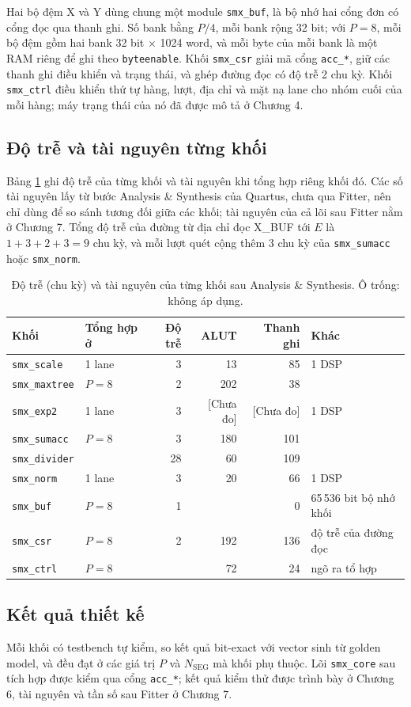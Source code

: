 Hai bộ đệm X và Y dùng chung một module \texttt{smx\_buf}, là bộ nhớ hai cổng đơn có cổng đọc qua thanh ghi. Số bank bằng $P/4$, mỗi bank rộng 32 bit; với $P = 8$, mỗi bộ đệm gồm hai bank 32 bit $\times$ 1024 word, và mỗi byte của mỗi bank là một RAM riêng để ghi theo \texttt{byteenable}. Khối \texttt{smx\_csr} giải mã cổng \texttt{acc\_*}, giữ các thanh ghi điều khiển và trạng thái, và ghép đường đọc có độ trễ 2 chu kỳ. Khối \texttt{smx\_ctrl} điều khiển thứ tự hàng, lượt, địa chỉ và mặt nạ lane cho nhóm cuối của mỗi hàng; máy trạng thái của nó đã được mô tả ở Chương 4.

\subsection{Độ trễ và tài nguyên từng khối}

Bảng \ref{tab:blk-res} ghi độ trễ của từng khối và tài nguyên khi tổng hợp riêng khối đó. Các số tài nguyên lấy từ bước Analysis \& Synthesis của Quartus, chưa qua Fitter, nên chỉ dùng để so sánh tương đối giữa các khối; tài nguyên của cả lõi sau Fitter nằm ở Chương 7. Tổng độ trễ của đường từ địa chỉ đọc X\_BUF tới $E$ là $1 + 3 + 2 + 3 = 9$ chu kỳ, và mỗi lượt quét cộng thêm 3 chu kỳ của \texttt{smx\_sumacc} hoặc \texttt{smx\_norm}.

\begin{table}[htbp]
\centering
\small
\begin{tabular}{llrrrl}
\toprule
Khối & Tổng hợp ở & Độ trễ & ALUT & Thanh ghi & Khác \\
\midrule
\texttt{smx\_scale}   & 1 lane  & 3  & 13  & 85  & 1 DSP \\
\texttt{smx\_maxtree} & $P = 8$ & 2  & 202 & 38  & \\
\texttt{smx\_exp2}    & 1 lane  & 3  & [Chưa đo] & [Chưa đo] & 1 DSP \\
\texttt{smx\_sumacc}  & $P = 8$ & 3  & 180 & 101 & \\
\texttt{smx\_divider} &         & 28 & 60  & 109 & \\
\texttt{smx\_norm}    & 1 lane  & 3  & 20  & 66  & 1 DSP \\
\texttt{smx\_buf}     & $P = 8$ & 1  &     & 0   & 65\,536 bit bộ nhớ khối \\
\texttt{smx\_csr}     & $P = 8$ & 2  & 192 & 136 & độ trễ của đường đọc \\
\texttt{smx\_ctrl}    & $P = 8$ &    & 72  & 24  & ngõ ra tổ hợp \\
\bottomrule
\end{tabular}
\caption{Độ trễ (chu kỳ) và tài nguyên của từng khối sau Analysis \& Synthesis. Ô trống: không áp dụng.}
\label{tab:blk-res}
\end{table}

\subsection{Kết quả thiết kế}

Mỗi khối có testbench tự kiểm, so kết quả bit-exact với vector sinh từ golden model, và đều đạt ở các giá trị $P$ và $N_{\text{SEG}}$ mà khối phụ thuộc. Lõi \texttt{smx\_core} sau tích hợp được kiểm qua cổng \texttt{acc\_*}; kết quả kiểm thử được trình bày ở Chương 6, tài nguyên và tần số sau Fitter ở Chương 7.
